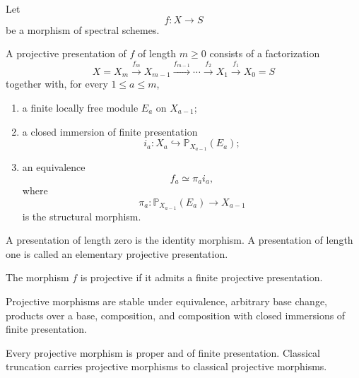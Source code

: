 \begin{definition}
\label{def:spectral-projective-morphism}
Let
\[
    f:X\longrightarrow S
\]
be a morphism of spectral schemes.

A projective presentation of \(f\) of length \(m\geq0\) consists of a
factorization
\[
    X=X_m
    \xrightarrow{f_m}
    X_{m-1}
    \xrightarrow{f_{m-1}}
    \cdots
    \xrightarrow{f_2}
    X_1
    \xrightarrow{f_1}
    X_0=S
\]
together with, for every \(1\leq a\leq m\),

\begin{enumerate}
    \item a finite locally free module \(E_a\) on \(X_{a-1}\);

    \item a closed immersion of finite presentation
    \[
        i_a:
        X_a
        \hookrightarrow
        \mathbb P_{X_{a-1}}(E_a);
    \]

    \item an equivalence
    \[
        f_a
        \simeq
        \pi_a i_a,
    \]
    where
    \[
        \pi_a:
        \mathbb P_{X_{a-1}}(E_a)
        \longrightarrow
        X_{a-1}
    \]
    is the structural morphism.
\end{enumerate}

A presentation of length zero is the identity morphism.  A presentation of
length one is called an elementary projective presentation.

The morphism \(f\) is projective if it admits a finite projective
presentation.
\end{definition}

\begin{proposition}
\label{prop:projective-permanence}
Projective morphisms are stable under equivalence, arbitrary base change,
products over a base, composition, and composition with closed immersions of
finite presentation.

Every projective morphism is proper and of finite presentation.  Classical
truncation carries projective morphisms to classical projective morphisms.
\end{proposition}

